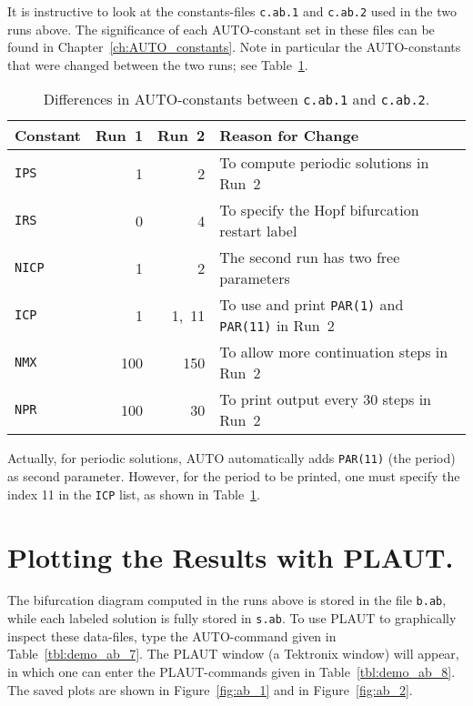 \documentclass[12pt]{report}
\begin{document}
It is instructive to look at the constants-files
{\tt c.ab.1} and {\tt c.ab.2} used in the two runs above.
The significance of each {\cal AUTO}-constant set in these files
can be found in Chapter~\ref{ch:AUTO_constants}.
Note in particular the {\cal AUTO}-constants that were changed 
between the two runs; see Table~\ref{tbl:demo_ab_6}.
\begin{table}[htbp]
\begin{center}
\begin{tabular}{| l | r | r | l |}
\hline
  Constant &  Run~1  &  Run~2 & Reason for Change \\
\hline
  {\tt IPS}  & 1  & 2  &  To compute periodic solutions in Run~2 \\  
\hline
  {\tt IRS}  & 0  & 4  &  To specify the Hopf bifurcation restart label \\  
\hline
  {\tt NICP}  & 1  & 2  &  The second run has two free parameters\\  
\hline
  {\tt ICP}  & 1  &1,~11  &  To use and print {\tt PAR(1)} and {\tt PAR(11)} in Run~2\\  
\hline
  {\tt NMX}  & 100 &150  &  To allow more continuation steps in Run~2 \\  
\hline
  {\tt NPR}  & 100 & 30  &  To print output every 30 steps in Run~2 \\  
\hline
\end{tabular}
\caption{Differences in {\cal AUTO}-constants between {\tt c.ab.1} and {\tt c.ab.2}.}
\label{tbl:demo_ab_6}
\end{center}
\end{table}

Actually, for periodic solutions, {\cal AUTO} automatically adds {\tt PAR(11)}
(the period) as second parameter.
However, for the period to be printed, one must specify the index 11
in the {\tt ICP} list, as shown in Table~\ref{tbl:demo_ab_6}.

\section{ Plotting the Results with {\cal PLAUT}.} \label{sec:Tutorial_PLAUT}
The bifurcation diagram computed in the runs above
is stored in the file {\tt b.ab},
while each labeled solution is fully stored in {\tt s.ab}.
To use {\cal PLAUT} to graphically inspect these data-files,
type the {\cal AUTO}-command given in Table~\ref{tbl:demo_ab_7}.
The {\cal PLAUT} window (a Tektronix window) will appear, in which one can enter
the {\cal PLAUT}-commands given in Table~\ref{tbl:demo_ab_8}.
The saved plots are shown in Figure~\ref{fig:ab_1}
and  in Figure~\ref{fig:ab_2}.
\end{document}
